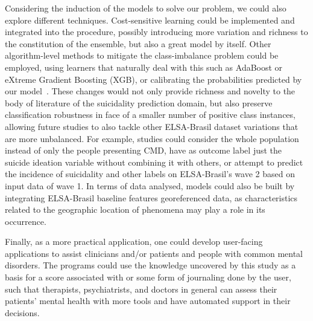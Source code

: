 Considering the induction of the models to solve our problem, we could also explore different techniques.
Cost-sensitive learning could be implemented and integrated into the procedure, possibly introducing more variation and richness to the constitution of the ensemble, but also a great model by itself.
Other algorithm-level methods to mitigate the class-imbalance problem could be employed, using learners that naturally deal with this such as AdaBoost or eXtreme Gradient Boosting (XGB), or calibrating the probabilities predicted by our model~\cite{Niculescu-Mizil2005}.
These changes would not only provide richness and novelty to the body of literature of the suicidality prediction domain, but also preserve classification robustness in face of a smaller number of positive class instances, allowing future studies to also tackle other ELSA-Brasil dataset variations that are more unbalanced.
For example, studies could consider the whole population instead of only the people presenting CMD, have as outcome label just the suicide ideation variable without combining it with others, or attempt to predict the incidence of suicidality and other labels on ELSA-Brasil's wave 2 based on input data of wave 1.
In terms of data analysed, models could also be built by integrating ELSA-Brasil baseline features georeferenced data, as characteristics related to the geographic location of phenomena may play a role in its occurrence.

Finally, as a more practical application, one could develop user-facing applications to assist clinicians and/or patients and people with common mental disorders.
The programs could use the knowledge uncovered by this study as a basis for a score associated with or some form of journaling done by the user, such that therapists, psychiatrists, and doctors in general can assess their patients' mental health with more tools and have automated support in their decisions.